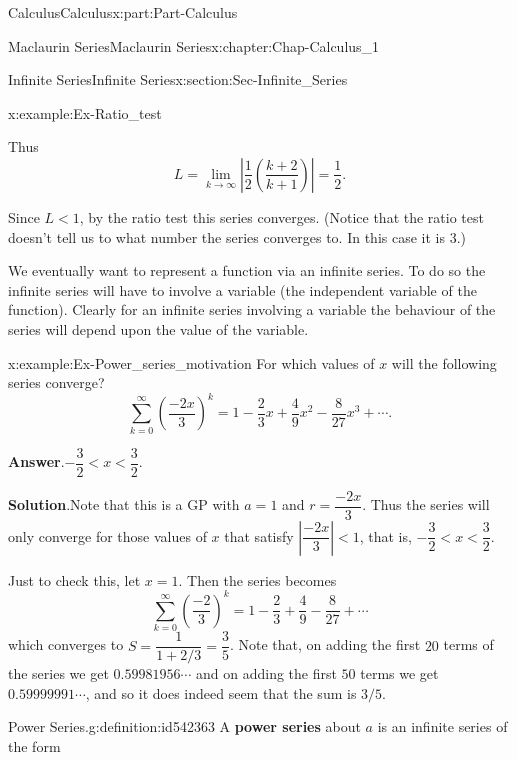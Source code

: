 \documentclass[oneside,10pt,]{book}
\newcommand{\blocktitlefont}{\relax}
\newcommand{\terminology}[1]{\textbf{#1}}
\numberwithin{equation}{section}
\begin{document}
\begin{partptx}{Calculus}{}{Calculus}{}{}{x:part:Part-Calculus}
\begin{chapterptx}{Maclaurin Series}{}{Maclaurin Series}{}{}{x:chapter:Chap-Calculus_1}
\begin{sectionptx}{Infinite Series}{}{Infinite Series}{}{}{x:section:Sec-Infinite_Series}
\begin{example}{}{x:example:Ex-Ratio_test}
\begin{equation*}
\end{equation*}
%
\par
Thus%
\begin{equation*}
L=\lim_{k\to\infty}\left|\dfrac{1}{2}\left(\dfrac{k+2}{k+1}\right)\right|=\dfrac{1}{2}.
\end{equation*}
%
\par
Since \(L<1\), by the ratio test this series converges. (Notice that the ratio test doesn't tell us to what number the series converges to. In this case it is 3.)%
\end{example}
We eventually want to represent a function via an infinite series. To do so the infinite series will have to involve a variable (the independent variable of the function). Clearly for an infinite series involving a variable the behaviour of the series will depend upon the value of the variable.%
\begin{example}{}{x:example:Ex-Power_series_motivation}%
For which values of \(x\) will the following series converge?%
\begin{equation*}
\sum_{k=0}^{\infty}\left(\dfrac{-2x}{3}\right)^k = 1-\dfrac{2}{3}x + \dfrac{4}{9}x^2 -\dfrac{8}{27}x^3 + \cdots.
\end{equation*}
%
\par\smallskip%
\noindent\textbf{\blocktitlefont Answer}.\hypertarget{g:answer:id542319}{}\quad{}\(-\dfrac{3}{2} < x < \dfrac{3}{2}\).%
\par\smallskip%
\noindent\textbf{\blocktitlefont Solution}.\hypertarget{g:solution:id542340}{}\quad{}Note that this is a GP with \(a=1\) and \(r=\dfrac{-2x}{3}\). Thus the series will only converge for those values of \(x\) that satisfy \(\left|\dfrac{-2x}{3}\right| < 1 \), that is, \(-\dfrac{3}{2} < x < \dfrac{3}{2}\).%
\par
Just to check this, let \(x=1\). Then the series becomes%
\begin{equation*}
\sum_{k=0}^{\infty}\left(\dfrac{-2}{3}\right)^k = 1-\dfrac{2}{3} + \dfrac{4}{9} -\dfrac{8}{27} + \cdots
\end{equation*}
which converges to \(S=\dfrac{1}{1+2/3}=\dfrac{3}{5}\). Note that, on adding the first \(20\) terms of the series we get \(0.59981956\cdots\) and on adding the first \(50\) terms we get \(0.59999991\cdots\), and so it does indeed seem that the sum is \(3/5\).%
\end{example}
\begin{definition}{Power Series.}{g:definition:id542363}%
A \terminology{power series} about \(a\) is an infinite series of the form%

\end{definition}
\end{sectionptx}
\end{chapterptx}
\end{partptx}
\end{document}
